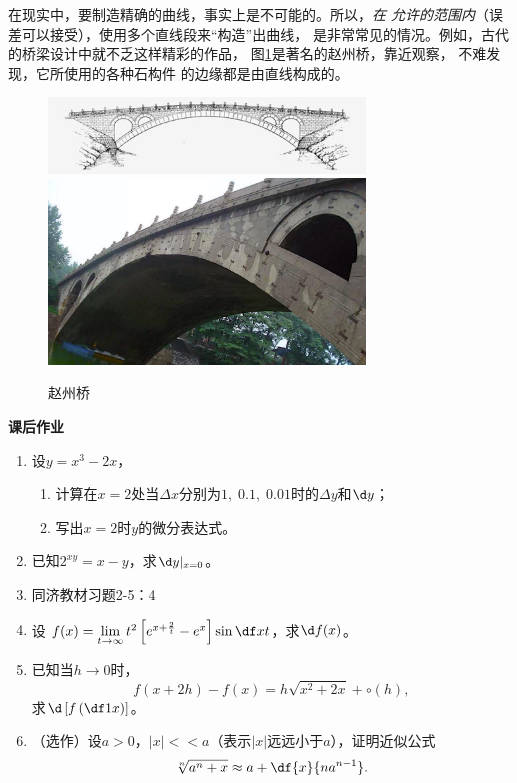 \bs
在现实中，要制造精确的曲线，事实上是不可能的。所以，{\it 在
允许的范围内}（误差可以接受），使用多个直线段来“构造”出曲线，
是非常常见的情况。例如，古代的桥梁设计中就不乏这样精彩的作品，
图\ref{fig:zhaozhouqiao}是著名的赵州桥，靠近观察，
不难发现，它所使用的各种石构件
的边缘都是由直线构成的。

\begin{figure}[h]
	\centering
	\includegraphics[width=0.75\textwidth]{./Images/Ch02/archBridge-1.jpg}\\
	\includegraphics[width=0.75\textwidth]{./Images/Ch02/zhaozhouqiao.jpg}
	\caption{赵州桥}
	\label{fig:zhaozhouqiao}
\end{figure}

\begin{ext}
	{\centering\bf 课后作业}
	
	\begin{enumerate}  
	  \item 设$y=x^3-2x$，
	  \begin{enumerate}[(1)]
	    \item 计算在$x=2$处当$\Delta x$分别为$1,\;0.1,\;
	  	0.01$时的$\Delta y$和$\d y$；
	    \item 写出$x=2$时$y$的微分表达式。
	  \end{enumerate}
	  \item 已知$2^{xy}=x-y$，求$\d y|_{x=0}$。
	  \item 同济教材习题2-5：4
	  \item 设
	  $f(x)=\lim\limits_{t\to\infty}t^2
	  \left[e^{x+\frac2t}-e^x\right]\sin\df xt$，求$\d f(x)$。
	  \item 已知当$h\to 0$时，
	  $$f(x+2h)-f(x)=h\sqrt{x^2+2x}+\circ(h),$$
	  求$\d\left[f\left(\df1x\right)\right]$。
	  \item （选作）设$a>0$，$|x|<<a$（表示$|x|$远远小于$a$），证明近似公式
	  $$\sqrt[n]{a^n+x}\approx a+\df{x}{na^{n-1}}.$$
	\end{enumerate}
\end{ext}

